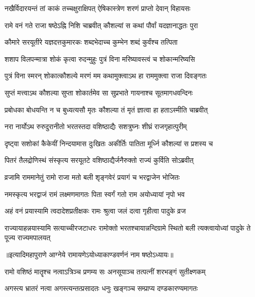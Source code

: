 \twolineshloka
{नखैर्विदारयन्तं तां काकं तच्चक्षुराक्षिपत्}
{ऐषिकास्त्रेण शरणं प्राप्तो देवान् विहायसः} %

\twolineshloka
{रामे वनं गते राजा षष्ठेऽह्नि निशि चाब्रवीत्}
{कौशल्यां स कथां पौर्वां यदज्ञानाद्धतः पुरा} %

\twolineshloka
{कौमारे सरयूतीरे यज्ञदत्तकुमारकः}
{शब्दभेदाच्च कुम्भेन शब्दं कुर्वंश्च तत्पिता} %

\twolineshloka
{शशाप विलपन्मात्रा शोकं कृत्वा रुदन्मुहुः}
{पुत्रं विना मरिष्यावस्त्वं च शोकान्मरिष्यसि} %

\twolineshloka
{पुत्रं विना स्मरन् शोकात्कौशल्ये मरणं मम}
{कथामुक्त्वाऽथ हा राममुक्त्वा राजा दिवङ्गतः} %

\twolineshloka
{सुप्तं मत्त्वाऽथ कौशल्या सुप्ता शोकार्तमेव सा}
{सुप्रभाते गायनाश्च सूतमागधवन्दिनः} %

\twolineshloka
{प्रबोधका बोधयन्ति न च बुध्यत्यसौ मृतः}
{कौशल्या तं मृतं ज्ञात्वा हा हताऽस्मीति चाब्रवीत्} %

\twolineshloka
{नरा नार्योऽथ रुरुदुरानीतो भरतस्तदा}
{वशिष्ठाद्यैः सशत्रुघ्नः शीघ्रं राजगृहात्पुरीम्} %

\twolineshloka
{दृष्ट्वा सशोकां कैकेयीं निन्दयामास दुःखितः}
{अकीर्तिः पातिता मूर्ध्नि कौशल्यां स प्रशस्य च} %

\twolineshloka
{पितरं तैलद्रोणिस्थं संस्कृत्य सरयूतटे}
{वशिष्ठाद्यैर्जनैरुक्तो राज्यं कुर्विति सोऽब्रवीत्} %

\twolineshloka
{व्रजामि राममानेतुं रामो राजा मतो बली}
{शृङ्गवेरं प्रयागं च भरद्वाजेन भोजितः} %

\twolineshloka
{नमस्कृत्य भरद्वाजं रामं लक्ष्मणमागतः}
{पिता स्वर्गं गतो राम अयोध्यायां नृपो भव} %

\twolineshloka
{अहं वनं प्रयास्यामि त्वदादेशप्रतीक्षकः}
{रामः श्रुत्वा जलं दत्वा गृहीत्वा पादुके व्रज} %

\threelineshloka
{राज्यायाहन्नयास्यामि सत्याच्चीरजटाधरः}
{रामोक्तो भरतश्चायान्नन्दिग्रामे स्थितो बली}
{त्यक्त्वायोध्यां पादुके ते पूज्य राज्यमपालयत्} %

॥इत्यादिमहापुराणे आग्नेये रामायणेऽयोध्याकाण्डवर्णनं नाम षष्ठोऽध्यायः॥



\twolineshloka
{रामो वशिष्ठं मातॄश्च नत्वाऽत्रिञ्च प्रणम्य सः}
{अनसूयाञ्च तत्पत्नीं शरभङ्गं सुतीक्ष्णकम्}%

\twolineshloka
{अगस्त्य भ्रातरं नत्वा अगस्त्यन्तत्प्रसादतः}
{धनुः खङ्गञ्च सम्प्राप्य दण्डकारण्यमागतः}%

